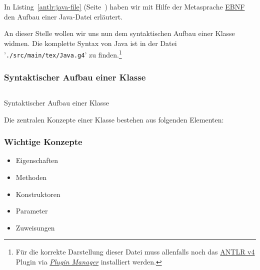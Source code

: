 In Listing~\ref{antlr:java-file} (Seite~\pageref{antlr:java-file}) haben wir mit Hilfe
der Metasprache \href{https://de.wikipedia.org/wiki/Erweiterte_Backus-Naur-Form}{EBNF}
den Aufbau einer Java-Datei erläutert.

An dieser Stelle wollen wir uns nun dem syntaktischen Aufbau einer Klasse widmen. Die komplette
Syntax von Java ist in der Datei '\texttt{./src/main/tex/Java.g4}' zu finden.\footnote{Für die
korrekte Darstellung dieser Datei muss allenfalls noch das
\href{https://github.com/antlr/intellij-plugin-v4}{ANTLR v4} Plugin via
\href{https://www.jetbrains.com/help/idea/managing-plugins.html}{\emph{Plugin Manager}}
installiert werden.}

\begin{frame}
    \frametitle<presentation>{Syntaktischer Aufbau einer Klasse}
    \begin{center}
    \end{center}
\end{frame}

\begin{listing}[h]
    \begin{center}
        \begin{minipage}{0.8\textwidth}
            \inputminted[firstline=90,lastline=103,frame=single,linenos]{antlr}{Java.g4}
        \end{minipage}
    \end{center}
    \caption{Syntaktischer Aufbau einer Klasse}
    \label{antlr:java-class}
\end{listing}


Die zentralen Konzepte einer Klasse bestehen aus folgenden Elementen:
\begin{frame}[fragile]
    \frametitle<presentation>{Wichtige Konzepte}
    \begin{itemize}
        \item Eigenschaften
        \item Methoden
        \item Konstruktoren
        \item Parameter
        \item Zuweisungen
    \end{itemize}
\end{frame}



